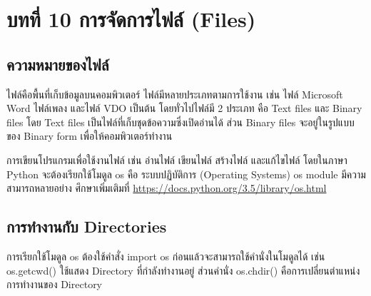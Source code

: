 \chapter{บทที่ 10	การจัดการไฟล์ (Files)}
\section{ความหมายของไฟล์}

ไฟล์คือพื้นที่เก็บข้อมูลบนคอมพิวเตอร์ ไฟล์มีหลายประเภทตามการใช้งาน เช่น ไฟล์ Microsoft Word ไฟล์เพลง และไฟล์ VDO เป็นต้น โดยทั่วไปไฟล์มี 2 ประเภท คือ Text files และ Binary files โดย Text files เป็นไฟล์ที่เก็บชุดข้อความซึ่งเปิดอ่านได้ ส่วน Binary files จะอยู่ในรูปแบบของ Binary form เพื่อให้คอมพิวเตอร์ทำงาน

การเขียนโปรแกรมเพื่อใช้งานไฟล์ เช่น อ่านไฟล์ เขียนไฟล์ สร้างไฟล์ และแก้ไขไฟล์ โดยในภาษา Python จะต้องเรียกใช้โมดูล os คือ ระบบปฏิบัติการ (Operating Systems) os module มีความสามารถหลายอย่าง ศึกษาเพิ่มเติมที่ \url{https://docs.python.org/3.5/library/os.html}

\section{การทำงานกับ Directories}

การเรียกใช้โมดูล os ต้องใช้คำสั่ง import os ก่อนแล้วจะสามารถใช้คำนั่งในโมดูลได้ เช่น os.getcwd() ใช้แสดง Directory ที่กำลังทำงานอยู่ ส่วนคำนั่ง os.chdir() คือการเปลี่ยนตำแหน่งการทำงานของ Directory

\begin{codelist}{}{}
\end{codelist}

